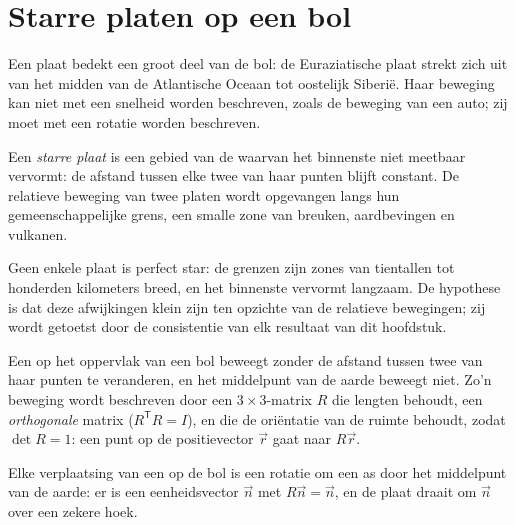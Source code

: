 \section{Starre platen op een bol}

Een plaat bedekt een groot deel van de bol: de Euraziatische plaat strekt zich uit van het midden van de Atlantische Oceaan tot oostelijk Siberië. Haar beweging kan niet met een snelheid worden beschreven, zoals de beweging van een auto; zij moet met een rotatie worden beschreven.

\begin{definition}\label{def:b1:plate-kinematics:rigid-plate}
Een \emph{starre plaat} is een gebied van de  waarvan het binnenste niet meetbaar vervormt: de afstand tussen elke twee van haar punten blijft constant. De relatieve beweging van twee platen wordt opgevangen langs hun gemeenschappelijke grens, een smalle zone van breuken, aardbevingen en vulkanen.
\end{definition}

Geen enkele plaat is perfect star: de grenzen zijn zones van tientallen tot honderden kilometers breed, en het binnenste vervormt langzaam. De hypothese is dat deze afwijkingen klein zijn ten opzichte van de relatieve bewegingen; zij wordt getoetst door de consistentie van elk resultaat van dit hoofdstuk.

Een  op het oppervlak van een bol beweegt zonder de afstand tussen twee van haar punten te veranderen, en het middelpunt van de aarde beweegt niet. Zo'n beweging wordt beschreven door een $3\times3$-matrix $R$ die lengten behoudt, een \emph{orthogonale} matrix ($R^{\mathsf T}R = I$), en die de oriëntatie van de ruimte behoudt, zodat $\det R = 1$: een punt op de positievector $\vec r$ gaat naar $R\vec r$.

\begin{theorem}\label{thm:b1:plate-kinematics:euler}
Elke verplaatsing van een  op de bol is een rotatie om een as door het middelpunt van de aarde: er is een eenheidsvector $\vec n$ met $R\vec n = \vec n$, en de plaat draait om $\vec n$ over een zekere hoek.
\end{theorem}

